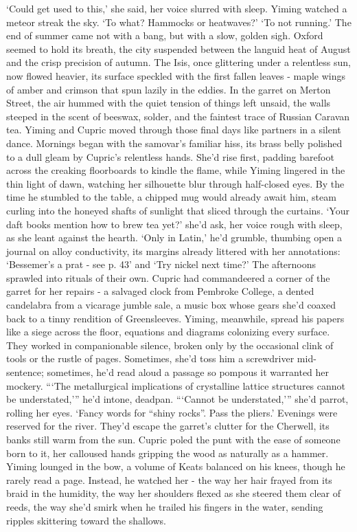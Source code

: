 `Could get used to this,' she said, her voice slurred with sleep.
Yiming watched a meteor streak the sky. `To what? Hammocks or heatwaves?'
`To not running.'
The end of summer came not with a bang, but with a slow, golden sigh. Oxford seemed to hold its breath, the city suspended between the languid heat of August and the crisp precision of autumn. The Isis, once glittering under a relentless sun, now flowed heavier, its surface speckled with the first fallen leaves - maple wings of amber and crimson that spun lazily in the eddies. In the garret on Merton Street, the air hummed with the quiet tension of things left unsaid, the walls steeped in the scent of beeswax, solder, and the faintest trace of Russian Caravan tea.
Yiming and Cupric moved through those final days like partners in a silent dance. Mornings began with the samovar's familiar hiss, its brass belly polished to a dull gleam by Cupric's relentless hands. She'd rise first, padding barefoot across the creaking floorboards to kindle the flame, while Yiming lingered in the thin light of dawn, watching her silhouette blur through half-closed eyes. By the time he stumbled to the table, a chipped mug would already await him, steam curling into the honeyed shafts of sunlight that sliced through the curtains.
`Your daft books mention how to brew tea yet?' she'd ask, her voice rough with sleep, as she leant against the hearth.
`Only in Latin,' he'd grumble, thumbing open a journal on alloy conductivity, its margins already littered with her annotations: `Bessemer's a prat - see p. 43' and `Try nickel next time?'
The afternoons sprawled into rituals of their own. Cupric had commandeered a corner of the garret for her repairs - a salvaged clock from Pembroke College, a dented candelabra from a vicarage jumble sale, a music box whose gears she'd coaxed back to a tinny rendition of Greensleeves. Yiming, meanwhile, spread his papers like a siege across the floor, equations and diagrams colonizing every surface. They worked in companionable silence, broken only by the occasional clink of tools or the rustle of pages. Sometimes, she'd toss him a screwdriver mid-sentence; sometimes, he'd read aloud a passage so pompous it warranted her mockery.
```The metallurgical implications of crystalline lattice structures cannot be understated,''' he'd intone, deadpan.
```Cannot be understated,''' she'd parrot, rolling her eyes. `Fancy words for ``shiny rocks''. Pass the pliers.'
Evenings were reserved for the river. They'd escape the garret's clutter for the Cherwell, its banks still warm from the sun. Cupric poled the punt with the ease of someone born to it, her calloused hands gripping the wood as naturally as a hammer. Yiming lounged in the bow, a volume of Keats balanced on his knees, though he rarely read a page. Instead, he watched her - the way her hair frayed from its braid in the humidity, the way her shoulders flexed as she steered them clear of reeds, the way she'd smirk when he trailed his fingers in the water, sending ripples skittering toward the shallows.
